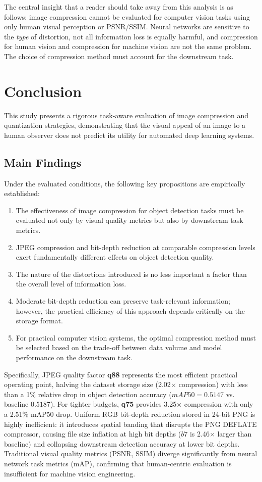 \documentclass[12pt, a4paper]{article}
\begin{document}
The central insight that a reader should take away from this analysis is as follows: image compression cannot be evaluated for computer vision tasks using only human visual perception or PSNR/SSIM. Neural networks are sensitive to the \textit{type} of distortion, not all information loss is equally harmful, and compression for human vision and compression for machine vision are not the same problem. The choice of compression method must account for the downstream task.

\section{Conclusion}
This study presents a rigorous task-aware evaluation of image compression and quantization strategies, demonstrating that the visual appeal of an image to a human observer does not predict its utility for automated deep learning systems.

\subsection{Main Findings}
Under the evaluated conditions, the following key propositions are empirically established:
\begin{enumerate}
    \item The effectiveness of image compression for object detection tasks must be evaluated not only by visual quality metrics but also by downstream task metrics.
    \item JPEG compression and bit-depth reduction at comparable compression levels exert fundamentally different effects on object detection quality.
    \item The nature of the distortions introduced is no less important a factor than the overall level of information loss.
    \item Moderate bit-depth reduction can preserve task-relevant information; however, the practical efficiency of this approach depends critically on the storage format.
    \item For practical computer vision systems, the optimal compression method must be selected based on the trade-off between data volume and model performance on the downstream task.
\end{enumerate}

Specifically, JPEG quality factor \textbf{q88} represents the most efficient practical operating point, halving the dataset storage size (2.02$\times$ compression) with less than a 1\% relative drop in object detection accuracy ($mAP50 = 0.5147$ vs. baseline $0.5187$). For tighter budgets, \textbf{q75} provides 3.25$\times$ compression with only a 2.51\% mAP50 drop. Uniform RGB bit-depth reduction stored in 24-bit PNG is highly inefficient: it introduces spatial banding that disrupts the PNG DEFLATE compressor, causing file size inflation at high bit depths ($b7$ is 2.46$\times$ larger than baseline) and collapsing downstream detection accuracy at lower bit depths. Traditional visual quality metrics (PSNR, SSIM) diverge significantly from neural network task metrics (mAP), confirming that human-centric evaluation is insufficient for machine vision engineering.
\end{document}
